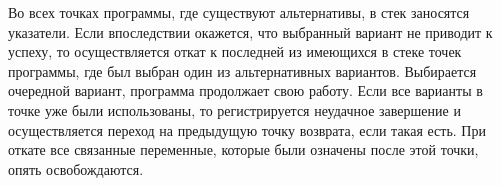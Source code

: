 \begin{enumerate}
Во всех точках программы, где существуют альтернативы, в стек заносятся указатели. Если впоследствии окажется, что выбранный вариант не приводит к успеху, то осуществляется откат к последней из имеющихся в стеке точек программы, где был выбран один из альтернативных вариантов. Выбирается очередной вариант, программа продолжает свою работу. Если все варианты в точке уже были использованы, то регистрируется неудачное завершение и осуществляется переход на предыдущую точку возврата, если такая есть. При откате все связанные переменные, которые были означены после этой точки, опять освобождаются.
\end{enumerate}
